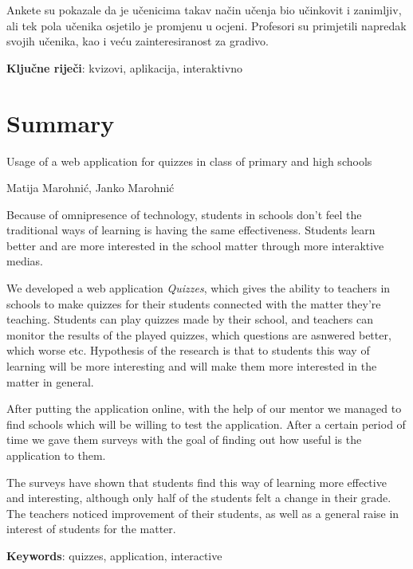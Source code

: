 \documentclass[11pt]{scrreprt}
\begin{document}
Ankete su pokazale da je učenicima takav način učenja bio učinkovit i
zanimljiv, ali tek pola učenika osjetilo je promjenu u ocjeni. Profesori su
primjetili napredak svojih učenika, kao i veću zainteresiranost za gradivo.

\textbf{Ključne riječi}: kvizovi, aplikacija, interaktivno

\chapter{Summary}

Usage of a web application for quizzes in class of primary and high schools

Matija Marohnić, Janko Marohnić

Because of omnipresence of technology, students in schools don't feel the
traditional ways of learning is having the same effectiveness. Students learn
better and are more interested in the school matter through more interaktive
medias.

We developed a web application \textit{Quizzes}, which gives the ability to
teachers in schools to make quizzes for their students connected with the
matter they're teaching. Students can play quizzes made by their school, and
teachers can monitor the results of the played quizzes, which questions are
asnwered better, which worse etc. Hypothesis of the research is that to
students this way of learning will be more interesting and will make them more
interested in the matter in general.

After putting the application online, with the help of our mentor we managed to
find schools which will be willing to test the application. After a certain
period of time we gave them surveys with the goal of finding out how useful is
the application to them.

The surveys have shown that students find this way of learning more effective
and interesting, although only half of the students felt a change in their
grade. The teachers noticed improvement of their students, as well as a general
raise in interest of students for the matter.

\textbf{Keywords}: quizzes, application, interactive
\end{document}
